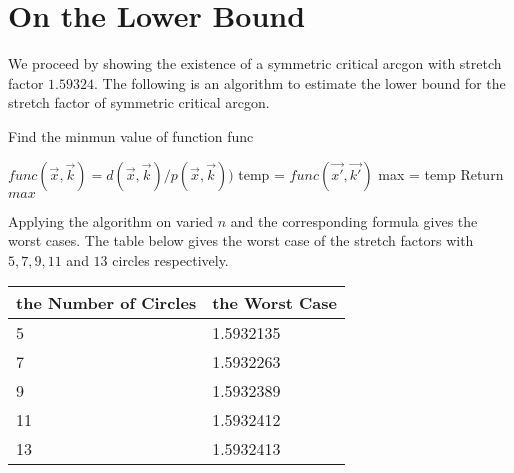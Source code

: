 
\chapter{On the Lower Bound}
We proceed by showing the existence of a symmetric critical arcgon with stretch factor $1.59324$. 
The following is an algorithm to estimate the lower bound for the stretch factor of symmetric critical arcgon. 

\begin{algorithm}
\caption{Find the minmun value of function func}
\label{check}
\begin{algorithmic}[1]
\State $func(\vec{x},\vec{k}) = d(\vec{x},\vec{k})/p(\vec{x},\vec{k})) $
\State temp = $func(\vec{x'}, \vec{k'})$
\State max = temp
\State Return $max$
\EndIf
\EndFor
\EndProcedure
\end{algorithmic}
\end{algorithm}



Applying the algorithm on varied $n$ and the corresponding formula gives the worst cases. The table below gives the worst case of the stretch factors with $5, 7, 9, 11$  and $13$ circles respectively.
\begin{table}[ht]
\centering
\begin{tabular}{l|l}
the Number of Circles & the Worst Case \\ \hline
5                     & 1.5932135      \\
7                     & 1.5932263      \\
9                     & 1.5932389      \\
11                    & 1.5932412      \\
13                    & 1.5932413     
\end{tabular}
\end{table}

\vspace{1in}
